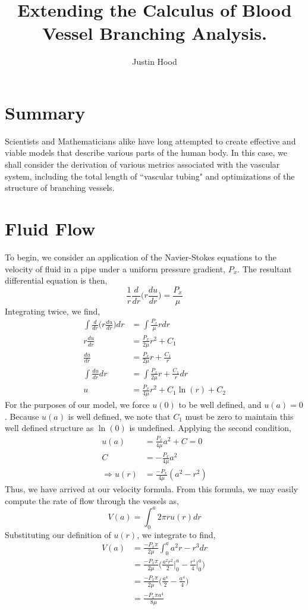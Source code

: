 \documentclass[letterpaper,10pt]{article}
\title{Extending the Calculus of Blood Vessel Branching Analysis.}
\author{Justin Hood}
\begin{document}
\maketitle
\section*{Summary}
Scientists and Mathematicians alike have long attempted to create effective and viable models that describe various parts of the human body. In this case, we shall consider the derivation of various metrics associated with the vascular system, including the total length of ``vascular tubing" and optimizations of the structure of branching vessels.
\section*{Fluid Flow}
To begin, we consider an application of the Navier-Stokes equations to the velocity of fluid in a pipe under a uniform pressure gradient, $P_x$. The resultant differential equation is then,
\[\frac{1}{r}\frac{d}{dr}\bigg(r\frac{du}{dr}\bigg)=\frac{P_x}{\mu}\]
Integrating twice, we find,
\begin{align*}
\int \frac{d}{dr}\bigg(r\frac{du}{dr}\bigg)dr &= \int \frac{P_x}{\mu}r dr\\
r\frac{du}{dr} &= \frac{P_x}{2\mu}r^2+C_1\\
\frac{du}{dr} &= \frac{P_x}{2\mu}r+\frac{C_1}{r}\\
\int \frac{du}{dr} dr &= \int \frac{P_x}{2\mu}r+\frac{C_1}{r} dr\\
u &= \frac{P_x}{4\mu}r^2+C_1\ln(r)+C_2
\end{align*}
For the purposes of our model, we force $u(0)$ to be well defined, and $u(a)=0$. Because $u(a)$ is well defined, we note that $C_1$ must be zero to maintain this well defined structure as $\ln(0)$ is undefined. Applying the second condition,
\begin{align*}
u(a) &= \frac{P_x}{4\mu}a^2+C=0\\
C &= -\frac{P_x}{4\mu}a^2\\
\Rightarrow u(r) &= \frac{-P_x}{4\mu}(a^2-r^2)
\end{align*}
Thus, we have arrived at our velocity formula. From this formula, we may easily compute the rate of flow through the vessels as,
\[V(a)=\int_0^a 2\pi ru(r)dr\]
Substituting our definition of $u(r)$, we integrate to find,
\begin{align*}
V(a) &= \frac{-P_x\pi}{2\mu}\int_0^a a^2r-r^3dr\\
&=\frac{-P_x\pi}{2\mu}\bigg(\frac{a^2r^2}{2}\bigg|_0^a-\frac{r^4}{4}\bigg|_0^a\bigg)\\
&=\frac{-P_x\pi}{2\mu}\bigg(\frac{a^4}{2}-\frac{a^4}{4}\bigg)\\
&=\frac{-P_x\pi a^4}{8\mu}
\end{align*}
\end{document}
